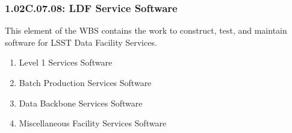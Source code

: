 \subsubsection*{1.02C.07.08: LDF Service Software}

This element of the WBS contains the work to construct, test, and maintain software for LSST Data Facility Services.

\begin{enumerate}

  \item{Level 1 Services Software}
  \item{Batch Production Services Software}
  \item{Data Backbone Services Software}
  \item{Miscellaneous Facility Services Software}

\end{enumerate}

